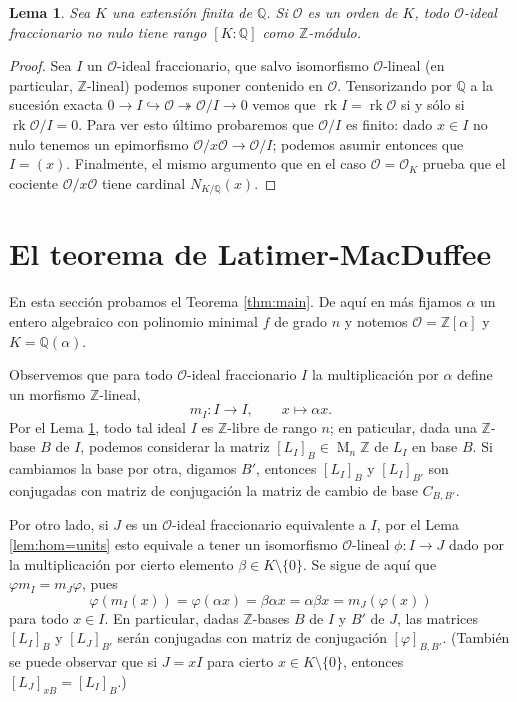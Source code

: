 \documentclass[11pt,a4paper]{amsart}
\newcommand{\Q}{\mathbb{Q}}
\newcommand{\Z}{\mathbb{Z}}
\DeclareMathOperator{\rk}{rk}
\DeclareMathOperator{\M}{M}
\numberwithin{equation}{section}
\theoremstyle{plain}
\newtheorem{lem}[equation]{Lema}
\renewcommand{\O}{\mathcal{O}}
\begin{document}
\begin{lem} \label{lem:frac-range}
Sea $K$ una extensión finita de $\Q$. Si $\O$ es
un orden de $K$, todo $\O$-ideal fraccionario no nulo
tiene rango $[K:\Q]$ como $\Z$-módulo.
\end{lem}
\begin{proof} Sea $I$ un $\O$-ideal fraccionario, que salvo
isomorfismo $\O$-lineal (en particular, $\Z$-lineal) podemos suponer
contenido en $\O$. Tensorizando por $\Q$ a la sucesión exacta
$0\to I \hookrightarrow \O \twoheadrightarrow \O/I \to 0$
vemos que $\rk I = \rk \O$ si y sólo si $\rk \O/I = 0$.
Para ver esto último probaremos que $\O/I$ es finito:
dado $x \in I$ no nulo tenemos un epimorfismo
$\O/x \O \to \O/I$; podemos asumir entonces que $I = (x)$.
Finalmente, el mismo argumento que en el caso $\O = \O_K$ prueba que
el cociente $\O/x \O$ tiene cardinal $N_{K/\Q}(x)$.
\end{proof}

\section{El teorema de Latimer-MacDuffee}\label{sec:main}

En esta sección probamos el Teorema \ref{thm:main}.
De aquí en más fijamos $\alpha$ un entero algebraico con polinomio minimal $f$
de grado $n$ y notemos $\mathcal O = \Z[\alpha]$ y $K = \Q(\alpha)$.

Observemos que para todo $\O$-ideal fraccionario $I$
la multiplicación por $\alpha$ define un morfismo
$\Z$-lineal,
\[
m_I \colon I \to I, \qquad x \mapsto \alpha x.
\]
Por el Lema \ref{lem:frac-range}, todo tal ideal $I$ es $\Z$-libre
de rango $n$; en paticular, dada una $\Z$-base $B$ de $I$, podemos considerar
la matriz $[L_I]_B \in \M_n \Z$ de $L_I$ en base $B$.
Si cambiamos la base por otra, digamos $B'$, entonces $[L_I]_B$
y $[L_I]_{B'}$ son conjugadas con matriz de conjugación
la matriz de cambio de base $C_{B,B'}$.

Por otro lado, si $J$ es un $\O$-ideal fraccionario equivalente a $I$,
por el Lema \ref{lem:hom=units} esto equivale a tener un
isomorfismo $\O$-lineal $\phi \colon I \to J$
dado por la multiplicación
por cierto elemento $\beta \in K \setminus \{0\}$. Se sigue de aquí que
$\varphi m_I = m_J \varphi$, pues
\[
\varphi(m_I(x)) = \varphi(\alpha x) = \beta \alpha x
= \alpha \beta x = m_J(\varphi(x))
\]
para todo $x \in I$. En particular, dadas $\Z$-bases $B$ de $I$ y $B'$ de $J$,
las matrices $[L_I]_{B}$ y $[L_J]_{B'}$ serán conjugadas con matriz de
conjugación $[\varphi]_{B, B'}$. (También se puede observar que si $J = xI$
para cierto $x \in K \setminus \{0\}$, entonces $[L_J]_{xB} = [L_I]_B$.)
\end{document}
